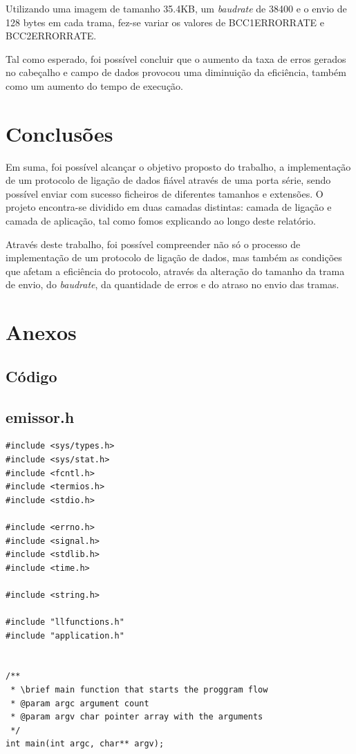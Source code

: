\documentclass[11pt]{article}
\begin{document}
Utilizando uma imagem de tamanho 35.4KB, um \textit{baudrate} de 38400 e o envio de 128 bytes em cada trama, fez-se variar os valores de BCC1ERRORRATE e BCC2ERRORRATE.

Tal como esperado, foi possível concluir que o aumento da taxa de erros gerados no cabeçalho e campo de dados provocou uma diminuição da eficiência, também como um aumento do tempo de execução.

\section{Conclusões}

Em suma, foi possível alcançar o objetivo proposto do trabalho, a implementação de um protocolo de ligação de dados fiável através de uma porta série, sendo possível enviar com sucesso ficheiros de diferentes tamanhos e extensões. O projeto encontra-se dividido em duas camadas distintas: camada de ligação e camada de aplicação, tal como fomos explicando ao longo deste relatório.

Através deste trabalho, foi possível compreender não só o processo de implementação de um protocolo de ligação de dados, mas também as condições que afetam a eficiência do protocolo, através da alteração do tamanho da trama de envio, do \textit{baudrate}, da quantidade de erros e do atraso no envio das tramas.


\section{Anexos}

\subsection{Código}

\subsection{emissor.h}
\begin{lstlisting}[style=CStyle]
#include <sys/types.h>
#include <sys/stat.h>
#include <fcntl.h>
#include <termios.h>
#include <stdio.h>

#include <errno.h>
#include <signal.h>
#include <stdlib.h>
#include <time.h>

#include <string.h>

#include "llfunctions.h"
#include "application.h"


/**
 * \brief main function that starts the proggram flow
 * @param argc argument count
 * @param argv char pointer array with the arguments
 */
int main(int argc, char** argv);

\end{lstlisting}
\end{document}
